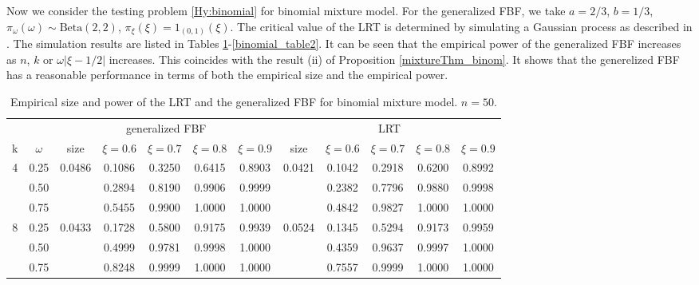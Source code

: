 \documentclass[11pt]{article}
\theoremstyle{plain}
\theoremstyle{definition}
\theoremstyle{remark}
\begin{document}
Now we consider the testing problem \eqref{Hy:binomial} for binomial mixture model.
For the generalized FBF, we take $a = 2/3$, $b = 1/3$,  $\pi_\omega(\omega)\sim \text{Beta}(2, 2)$, $\pi_\xi(\xi) = 1_{(0,1)}(\xi)$.
The critical value of the LRT is determined by simulating a Gaussian process as described in \cite{Chernoff1995}.
The simulation results are listed in Tables \ref{binomial_table1}-\ref{binomial_table2}.
It can be seen that the empirical power of the generalized FBF increases as $n$, $k$ or $\omega |\xi - 1/2|$ increases.
This coincides with the result (ii) of Proposition \ref{mixtureThm_binom}.
It shows that the generelized FBF has a reasonable performance in terms of both the empirical size and the empirical power.
\begin{table}[ht]
    \caption{Empirical size and power of the LRT and the generalized FBF for binomial mixture model. $n=50$.}
    \label{binomial_table1}
    \small
    \centering
    \begin{tabular}{cccccccccccc}
        \toprule
         & & \multicolumn{5}{c}{generalized FBF} &\multicolumn{5}{c}{LRT}\\
        \cmidrule(r){3-7}\cmidrule(r){8-12}
        k & $\omega$ 
        & size & $\xi= 0.6$& $\xi= 0.7$& $\xi= 0.8$& $\xi= 0.9$   
        & size & $\xi= 0.6$& $\xi= 0.7$& $\xi= 0.8$& $\xi= 0.9$
        \\ 
        \midrule
        4 &0.25 & 0.0486& 0.1086& 0.3250& 0.6415 & 0.8903 & 0.0421& 0.1042 & 0.2918 & 0.6200 &0.8992 \\
        &0.50   &       & 0.2894& 0.8190& 0.9906 &0.9999&         &0.2382 & 0.7796 & 0.9880 & 0.9998\\
        &0.75 &         &0.5455 & 0.9900& 1.0000 &1.0000&         &0.4842 & 0.9827 & 1.0000 & 1.0000 \\
        \midrule
        8 &0.25 & 0.0433& 0.1728& 0.5800& 0.9175 & 0.9939 & 0.0524& 0.1345 & 0.5294 & 0.9173 &0.9959\\
        &0.50   &       & 0.4999& 0.9781& 0.9998 & 1.0000 &       & 0.4359 & 0.9637 & 0.9997 &1.0000\\
        &0.75   &       & 0.8248& 0.9999& 1.0000 & 1.0000 &       & 0.7557 & 0.9999 & 1.0000 &1.0000\\
        \bottomrule

    \end{tabular}

\end{table}
\end{document}
